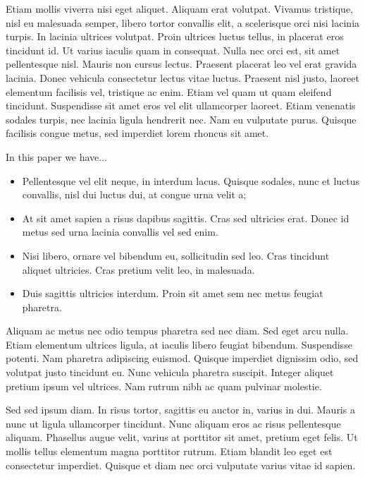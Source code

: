 \documentclass[a4paper,fleqn,usenatbib]{mnras}
\begin{document}
Etiam mollis viverra nisi eget aliquet. Aliquam erat volutpat. Vivamus
tristique, nisl eu malesuada semper, libero tortor convallis elit, a
scelerisque orci nisi lacinia turpis. In lacinia ultrices
volutpat. Proin ultrices luctus tellus, in placerat eros tincidunt
id. Ut varius iaculis quam in consequat. Nulla nec orci est, sit amet
pellentesque nisl. Mauris non cursus lectus. Praesent placerat leo vel
erat gravida lacinia. Donec vehicula consectetur lectus vitae
luctus. Praesent nisl justo, laoreet elementum facilisis vel,
tristique ac enim. Etiam vel quam ut quam eleifend
tincidunt. Suspendisse sit amet eros vel elit ullamcorper
laoreet. Etiam venenatis sodales turpis, nec lacinia ligula hendrerit
nec. Nam eu vulputate purus. Quisque facilisis congue metus, sed
imperdiet lorem rhoncus sit amet.

In this paper we have... 
\begin{itemize}
\item Pellentesque vel elit neque, in interdum lacus. Quisque sodales, nunc et luctus convallis, nisl dui luctus dui, at congue urna velit a; 
\item At sit amet sapien a risus dapibus sagittis. Cras sed ultricies erat. Donec id metus sed urna lacinia convallis vel sed enim. 
\item Nisi libero, ornare vel bibendum eu, sollicitudin sed leo. Cras tincidunt aliquet ultricies. Cras pretium velit leo, in malesuada. 
\item Duis sagittis ultricies interdum. Proin sit amet sem nec metus feugiat pharetra.
\end{itemize}

Aliquam ac metus nec odio tempus pharetra sed nec diam. Sed eget arcu
nulla. Etiam elementum ultrices ligula, at iaculis libero feugiat
bibendum. Suspendisse potenti. Nam pharetra adipiscing
euismod. Quisque imperdiet dignissim odio, sed volutpat justo
tincidunt eu. Nunc vehicula pharetra suscipit. Integer aliquet pretium
ipsum vel ultrices. Nam rutrum nibh ac quam pulvinar molestie.

Sed sed ipsum diam. In risus tortor, sagittis eu auctor in, varius in
dui. Mauris a nunc ut ligula ullamcorper tincidunt. Nunc aliquam eros
ac risus pellentesque aliquam. Phasellus augue velit, varius at
porttitor sit amet, pretium eget felis. Ut mollis tellus elementum
magna porttitor rutrum. Etiam blandit leo eget est consectetur
imperdiet. Quisque et diam nec orci vulputate varius vitae id sapien.






\bsp	%
\label{lastpage}
\end{document}
